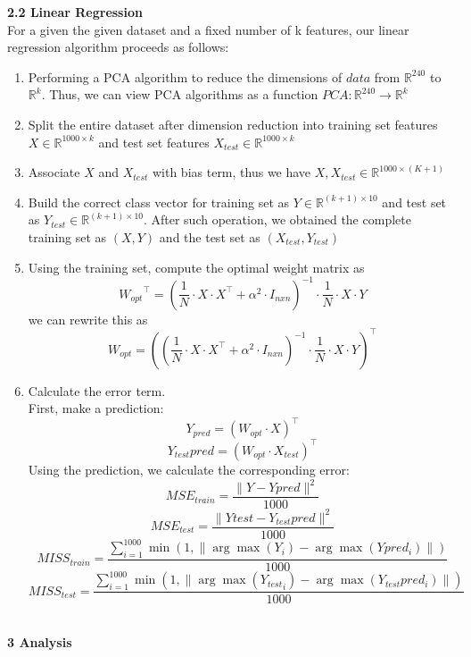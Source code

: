 \documentclass[a4paper]{article}
\begin{document}
\textbf{{\large 2.2 Linear Regression}} \\

For a given the given dataset and a fixed number of k features, our linear regression algorithm proceeds as follows: 
\begin{enumerate}
\item  Performing a PCA algorithm to reduce the dimensions of $data$ from $\mathbb{R}^{240}$ to $\mathbb{R}^{k}$. Thus, we can view PCA algorithms as a function $PCA: \mathbb{R}^{240} \to \mathbb{R}^{k}$
\item Split the entire dataset after dimension reduction into training set features $X \in \mathbb{R}^{1000 \times k}$ and test set features $X_{test} \in \mathbb{R}^{1000 \times k}$
\item Associate $X$ and $X_{test}$ with bias term, thus we have $X, X_{test} \in \mathbb{R}^{1000 \times (K + 1)}$
\item Build the correct class vector for training set as $Y \in \mathbb{R}^{(k + 1) \times 10}$ and test set as $Y_{test} \in \mathbb{R}^{(k + 1) \times 10}$. After such operation, we obtained the complete training set as $(X, Y)$ and the test set as $(X_{test}, Y_{test})$
\item Using the training set, compute the optimal weight matrix as 
$$ {W_{opt}}^\top = (\frac{1}{N} \cdot X \cdot X^\top + \alpha^2 \cdot I_{nxn})^{-1} \cdot \frac{1}{N} \cdot X \cdot Y $$
we can rewrite this as 
$$ W_{opt} = ((\frac{1}{N} \cdot X \cdot X^\top + \alpha^2 \cdot I_{nxn})^{-1} \cdot \frac{1}{N} \cdot X \cdot Y)^\top $$
\item Calculate the error term. \\
First, make a prediction: 
$$ Y_{pred} = (W_{opt} \cdot X)^\top $$
$$ Y_{test}pred = (W_{opt} \cdot X_{test})^\top $$
Using the prediction, we calculate the corresponding error:
$$ MSE_{train} = \frac{\|Y - Ypred\|^2}{1000} $$
$$ MSE_{test} = \frac{\|Ytest - Y_{test}pred\|^2}{1000} $$
$$ MISS_{train} = \frac{\sum_{i = 1}^{1000} \min(1, \|\arg\max(Y_i) - \arg\max(Ypred_i)\|)}{1000} $$
$$ MISS_{test} = \frac{\sum_{i = 1}^{1000} \min(1, \|\arg\max({Y_{test}}_i) - \arg\max(Y_{test}pred_i)\|)}{1000} $$ \\ 
\end{enumerate}
\newpage
\textbf{{\Large 3 Analysis}} \\ 
\end{document}

